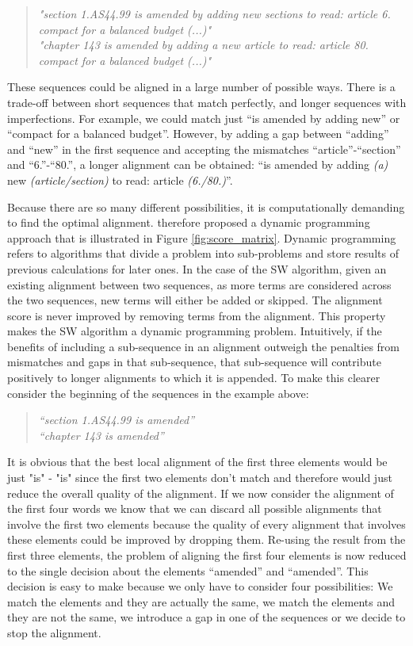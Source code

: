 \documentclass[12pt]{article} %
\begin{document}
\begin{quote}
\textit{"section 1.AS44.99 is amended by adding new sections to read: article 6. compact for a balanced budget (...)"} \\
\textit{"chapter 143 is amended by adding a new article to read: article 80. compact for a balanced budget (...)"}
\end{quote}

These sequences could be aligned in a large number of possible ways. There is a trade-off between short sequences that match perfectly, and longer sequences with imperfections. For example, we could match just ``is amended by adding new'' or ``compact for a balanced budget''. However, by adding a gap between ``adding'' and ``new'' in the first sequence and accepting the mismatches ``article''-``section'' and ``6.''-``80.'', a longer alignment can be obtained: ``is amended by adding \textit{(a)} new \textit{(article/section)} to read: article \textit{(6./80.)}''. 

Because there are so many different possibilities, it is computationally demanding to find the optimal alignment. \citet{smith1981identification} therefore proposed a dynamic programming approach that is illustrated in Figure \ref{fig:score_matrix}. Dynamic programming refers to algorithms that divide a problem into sub-problems and store results of previous calculations for later ones. In the case of the SW algorithm, given an existing alignment between two sequences, as more terms are considered across the two sequences, new terms will either be added or skipped. The alignment score is never improved by removing terms from the alignment. This property makes the SW algorithm a dynamic programming problem. Intuitively, if the benefits of including a sub-sequence in an alignment outweigh the penalties from mismatches and gaps in that sub-sequence, that sub-sequence will contribute positively to longer alignments to which it is appended. To make this clearer consider the beginning of the sequences in the example above:

\begin{quote}
\textit{``section 1.AS44.99 is amended''}\\
\textit{``chapter 143 is amended''}
\end{quote}

It is obvious that the best local alignment of the first three elements would be just "is" - "is" since the first two elements don't match and therefore would just reduce the overall quality of the alignment. If we now consider the alignment of the first four words we know that we can discard all possible alignments that involve the first two elements because the quality of every alignment that involves these elements could be improved by dropping them. Re-using the result from the first three elements, the problem of aligning the first four elements is now reduced to the single decision about the elements ``amended'' and ``amended''. This decision is easy to make because we only have to consider four possibilities: We match the elements and they are actually the same, we match the elements and they are not the same, we introduce a gap in one of the sequences or we decide to stop the alignment. 
\end{document}
